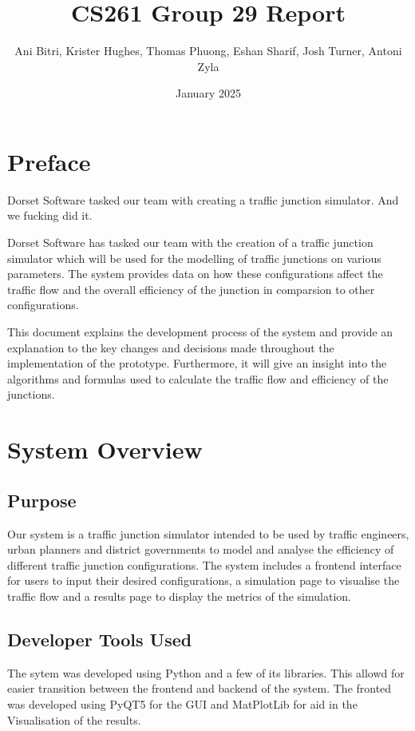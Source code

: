 \documentclass{article}
\title{\vspace{-1.5cm}CS261 Group 29 Report}
\author{Ani Bitri, Krister Hughes, Thomas Phuong, Eshan Sharif, Josh Turner, Antoni Zyla}
\date{January 2025}
\begin{document}
\maketitle

\section{Preface}

Dorset Software tasked our team with creating a traffic junction simulator. And we fucking did it. 

Dorset Software has tasked our team with the creation of a traffic junction simulator which will be used for the modelling of traffic junctions on various parameters. The system provides data on how these configurations 
affect the traffic flow and the overall efficiency of the junction in comparsion to other configurations. 

This document explains the development process of the system and provide an explanation to the key changes and decisions made throughout the implementation of the prototype. Furthermore,
it will give an insight into the algorithms and formulas used to calculate the traffic flow and efficiency of the junctions.

\section{System Overview}

    \subsection{Purpose}

        Our system is a traffic junction simulator intended to be used by traffic engineers, urban planners and district governments to model and analyse the efficiency of different traffic junction configurations. The
        system includes a frontend interface for users to input their desired configurations, a simulation page to visualise the traffic flow and a results page to display the metrics of the simulation.

    \subsection{Developer Tools Used}

        The sytem was developed using Python and a few of its libraries. This allowd for easier transition between the frontend and backend of the system. The
        fronted was developed using PyQT5 for the GUI and MatPlotLib for aid in the Visualisation of the results. 
\end{document}
